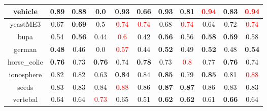 \documentclass{article}%
\begin{document}
\begin{tabular}{c|cccccccccc}
\hline%
vehicle&\textbf{0.89}&0.88&0.0&\textbf{0.93}&0.66&\textbf{0.93}&0.81&\textcolor{red}{ 
0.94
}&0.83&\textcolor{red}{ 
0.94
}\\%
\hline%
yeastME3&0.67&\textbf{0.69}&0.5&\textcolor{red}{ 
0.74
}&\textcolor{red}{ 
0.74
}&0.68&\textcolor{red}{ 
0.74
}&0.64&0.72&\textcolor{red}{ 
0.74
}\\%
\hline%
bupa&0.54&\textbf{0.56}&0.44&\textcolor{red}{ 
0.6
}&0.42&\textbf{0.56}&0.56&\textbf{0.58}&\textbf{0.59}&0.58\\%
\hline%
german&\textbf{0.48}&0.46&0.0&\textcolor{red}{ 
0.57
}&0.44&\textbf{0.52}&0.49&\textbf{0.52}&0.48&\textbf{0.54}\\%
\hline%
horse\_colic&\textbf{0.76}&0.73&\textbf{0.76}&0.74&\textbf{0.78}&0.73&\textcolor{red}{ 
0.8
}&0.77&\textbf{0.76}&0.74\\%
\hline%
ionosphere&0.82&0.82&0.63&\textbf{0.84}&0.84&\textbf{0.85}&0.79&\textbf{0.85}&0.81&\textcolor{red}{ 
0.88
}\\%
\hline%
seeds&0.83&0.83&0.84&\textcolor{red}{ 
0.88
}&0.86&\textbf{0.87}&\textbf{0.87}&0.86&0.83&0.83\\%
\hline%
vertebal&0.64&0.64&\textcolor{red}{ 
0.73
}&0.65&0.51&\textbf{0.62}&\textbf{0.62}&0.61&\textbf{0.66}&0.64\\%
\hline%
\end{tabular}

%
\end{document}
